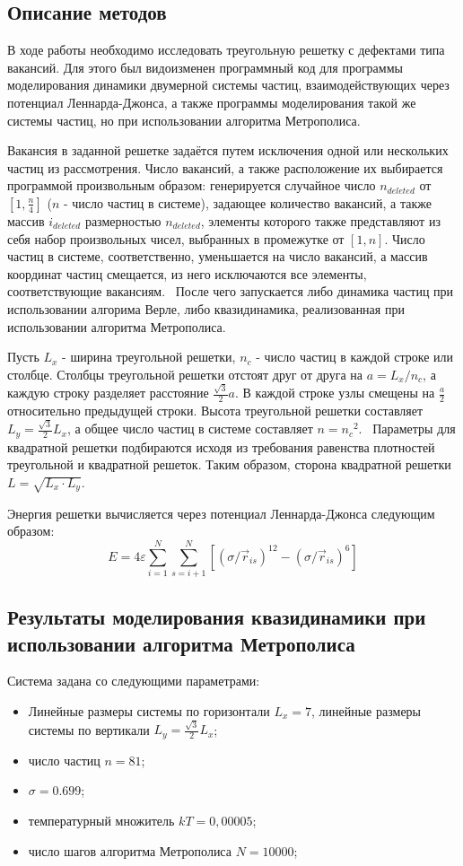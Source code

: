 \documentclass[14pt,a4paper,report]{ncc}
\begin{document}
\subsection{Описание  методов}
В ходе работы необходимо исследовать треугольную решетку с дефектами типа вакансий. Для этого был видоизменен программный код для программы моделирования динамики двумерной системы частиц, взаимодействующих через потенциал Леннарда-Джонса, а также программы моделирования такой же системы частиц, но при использовании алгоритма Метрополиса.
\

Вакансия в заданной решетке задаётся путем исключения одной или нескольких частиц из рассмотрения. Число вакансий, а также расположение их выбирается программой произвольным образом: генерируется случайное число $n_{deleted}$ от $[1, \frac{n}{4}]$ ($n$ - число частиц в системе), задающее количество вакансий, а также массив $ i_{deleted}$ размерностью $n_{deleted}$, элементы которого также представляют из себя набор произвольных чисел, выбранных в промежутке от $[1, n]$. Число частиц в системе, соответственно, уменьшается на число вакансий, а массив координат частиц смещается, из него исключаются все элементы, соответствующие вакансиям.
\
После чего запускается либо динамика частиц при использовании алгорима Верле, либо квазидинамика, реализованная при использовании алгоритма Метрополиса.

Пусть $L_x$ - ширина треугольной решетки, $n_c$ - число частиц в каждой строке или столбце. Столбцы треугольной решетки отстоят друг от друга на $a={L_x}/{n_c}$, а каждую строку разделяет расстояние ${\frac{\sqrt{3}}{2}} a$. В каждой строке узлы смещены на $\frac{a}{2}$ относительно предыдущей строки. Высота треугольной решетки составляет $L_y={\frac{\sqrt{3}}{2}} L_x$, а общее число частиц в системе составляет $n={n_c}^2$. 
\
Параметры для квадратной решетки подбираются исходя из требования равенства плотностей  треугольной и квадратной решеток. Таким образом, сторона квадратной решетки $L=\sqrt{L_x \cdot L_y}$.
\

Энергия решетки вычисляется через потенциал Леннарда-Джонса следующим образом:
\begin{equation}
E=4 \varepsilon \sum\limits_{i=1}^N \sum\limits_{s=i+1}^N{ [(\sigma/\vec{r}_{is})^{12} - (\sigma/\vec{r}_{is})^{6}  ]}
\end{equation}
\newpage
\subsection{Результаты моделирования квазидинамики при использовании алгоритма Метрополиса}
Система задана со следующими параметрами:
\begin{itemize}
\item Линейные размеры системы по горизонтали $L_x=7$, линейные размеры системы по вертикали $L_y=\frac{\sqrt{3}}{2}L_x$;
\item число частиц $n=81$;
\item $\sigma=0.699$;
\item температурный множитель $kT=0,00005$;
\item число шагов алгоритма Метрополиса $N=10000$;
\end{itemize}
\end{document}
